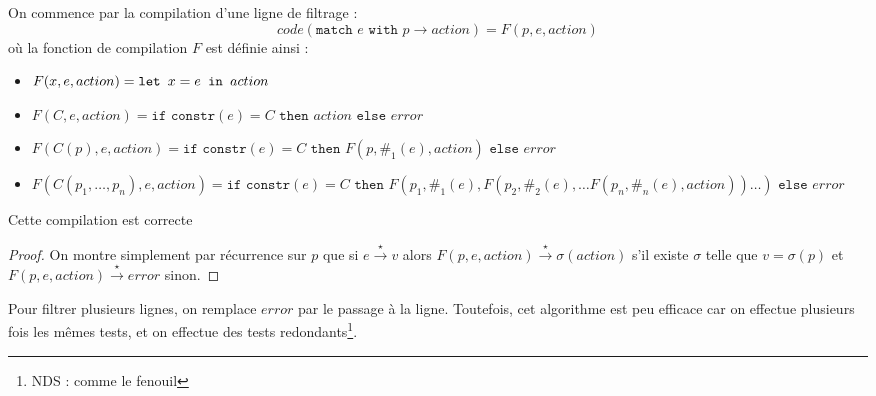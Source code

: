 \documentclass{cours}
\begin{document}
On commence par la compilation d'une ligne de filtrage :
\[
    code(\texttt{match } e \texttt{ with } p \rightarrow action) = F(p, e, action)
\]
où la fonction de compilation $F$ est définie ainsi :
\begin{itemize}
    \item $F(x, e, action) = \texttt{let } x = e \texttt{ in }{action}$
    \item $F(C, e, action) = \texttt{if constr}(e) = C \texttt{ then } action \texttt{ else } error$
    \item $F(C(p), e, action) = \texttt{if constr}(e) = C \texttt{ then } F(p, \texttt{\#}_{1}(e), action) \texttt{ else } error$
    \item $F(C(p_{1}, \ldots, p_{n}), e, action) = \texttt{if constr}(e) = C \texttt{ then } F(p_{1}, \texttt{\#}_{1}(e), F(p_{2}, \texttt{\#}_{2}(e), \ldots F(p_{n}, \texttt{\#}_{n}(e), action)) \ldots) \texttt{ else } error$
\end{itemize}

\begin{proposition}
    Cette compilation est correcte
\end{proposition}
\begin{proof}
    On montre simplement par récurrence sur $p$ que si $e\xrightarrow{\star} v$ alors $F(p, e, action) \xrightarrow{\star} \sigma(action)$ s'il existe $\sigma$ telle que $v = \sigma(p)$ et $F(p, e, action) \xrightarrow{\star} error$ sinon.
\end{proof}

Pour filtrer plusieurs lignes, on remplace $error$ par le passage à la ligne. Toutefois, cet algorithme est peu efficace car on effectue plusieurs fois les mêmes tests, et on effectue des tests redondants\footnote{NDS : comme le fenouil}.
\end{document}
